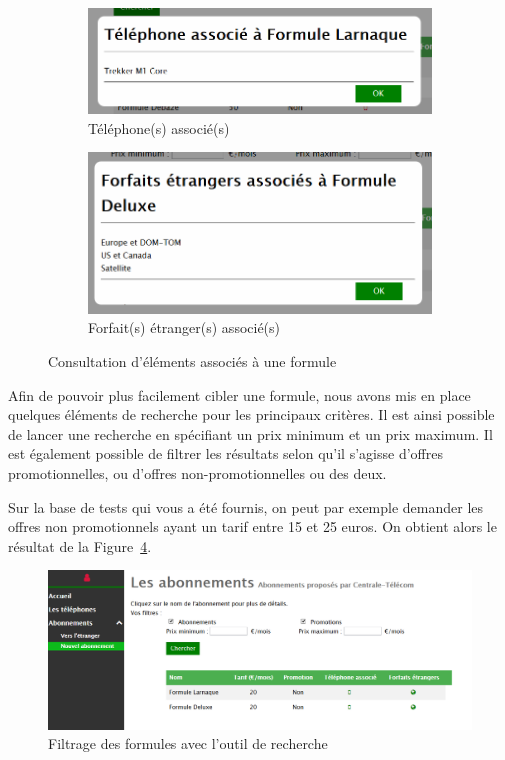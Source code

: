 \begin{figure}[ht]
  \begin{subfigure}{.48\textwidth}
    \centering
    \includegraphics[width=\textwidth]{images/Plateforme/telephones_associes}
    \caption{Téléphone(s) associé(s)}
    \label{fig:telephones-associes}
  \end{subfigure}\hfill%
  \begin{subfigure}{.48\textwidth}
    \centering
    \includegraphics[width=\textwidth]{images/Plateforme/foreign_associes}
    \caption{Forfait(s) étranger(s) associé(s)}
    \label{fig:foreign-associes}
  \end{subfigure}
  \caption{Consultation d'éléments associés à une formule}
\end{figure}

Afin de pouvoir plus facilement cibler une formule, nous avons mis en place quelques éléments de recherche pour les principaux critères. Il est ainsi possible de lancer une recherche en spécifiant un prix minimum et un prix maximum. Il est également possible de filtrer les résultats selon qu'il s'agisse d'offres promotionnelles, ou d'offres non-promotionnelles ou des deux.

Sur la base de tests qui vous a été fournis, on peut par exemple demander les offres non promotionnels ayant un tarif entre 15 et 25 euros. On obtient alors le résultat de la Figure~\ref{fig:filtrage-resultats}.

\begin{figure}[ht]
  \centering
  \includegraphics[width=.6\textwidth]{images/Plateforme/filtrage-resultats}
  \caption{Filtrage des formules avec l'outil de recherche}
  \label{fig:filtrage-resultats}
\end{figure}

